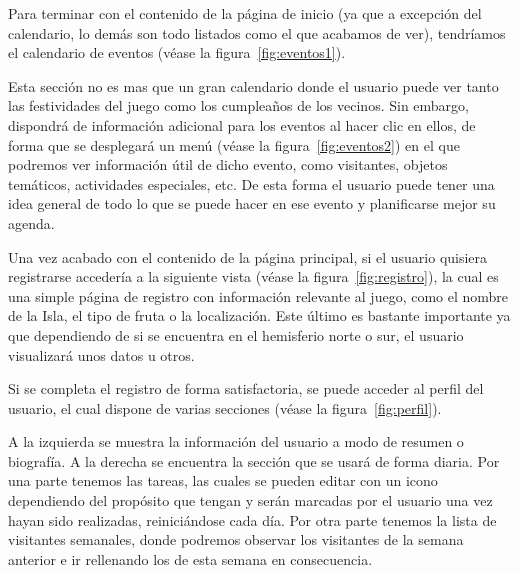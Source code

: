 Para terminar con el contenido de la página de inicio (ya que a excepción del calendario, lo demás son todo listados como el que acabamos de ver), tendríamos el calendario de eventos {(v\'ease la figura~\ref{fig:eventos1})}.\\


Esta sección no es mas que un gran calendario donde el usuario puede ver tanto las festividades del juego como los cumpleaños de los vecinos. Sin embargo, dispondrá de información adicional para los eventos al hacer clic en ellos, de forma que se desplegará un menú {(v\'ease la figura~\ref{fig:eventos2})} en el que podremos ver información útil de dicho evento, como visitantes, objetos temáticos, actividades especiales, etc. De esta forma el usuario puede tener una idea general de todo lo que se puede hacer en ese evento y planificarse mejor su agenda.\\


Una vez acabado con el contenido de la página principal, si el usuario quisiera registrarse accedería a la siguiente vista {(v\'ease la figura~\ref{fig:registro})}, la cual es una simple página de registro con información relevante al juego, como el nombre de la Isla, el tipo de fruta o la localización. Este último es bastante importante ya que dependiendo de si se encuentra en el hemisferio norte o sur, el usuario visualizará unos datos u otros.\\


Si se completa el registro de forma satisfactoria, se puede acceder al perfil del usuario, el cual dispone de varias secciones {(v\'ease la figura~\ref{fig:perfil})}.\\


A la izquierda se muestra la información del usuario a modo de resumen o biografía. A la derecha se encuentra la sección que se usará de forma diaria. Por una parte tenemos las tareas, las cuales se pueden editar con un icono dependiendo del propósito que tengan y serán marcadas por el usuario una vez hayan sido realizadas, reiniciándose cada día. Por otra parte tenemos la lista de visitantes semanales, donde podremos observar los visitantes de la semana anterior e ir rellenando los de esta semana en consecuencia.\\

